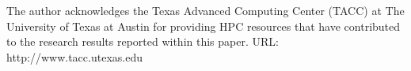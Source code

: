 

\vskip 1cm

The author acknowledges the Texas Advanced Computing Center (TACC) at The University of Texas at Austin for providing HPC resources that have contributed to the research results reported within this paper. URL: http://www.tacc.utexas.edu




\vskip 2cm
\noindent \AUTHOR \\
\PLACE \\
\DATE

